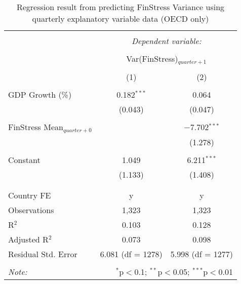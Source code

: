 
\begin{table}[!htbp] \centering 
  \caption{Regression result from predicting FinStress Variance using quarterly explanatory variable data (OECD only)} 
  \label{quarterly_reg} 
\small 
\begin{tabular}{@{\extracolsep{5pt}}lcc} 
\\[-1.8ex]\hline 
\hline \\[-1.8ex] 
 & \multicolumn{2}{c}{\textit{Dependent variable:}} \\ 
\cline{2-3} 
\\[-1.8ex] & \multicolumn{2}{c}{Var(FinStress)$_{quarter+1}$} \\ 
\\[-1.8ex] & (1) & (2)\\ 
\hline \\[-1.8ex] 
 GDP Growth (\%) & 0.182$^{***}$ & 0.064 \\ 
  & (0.043) & (0.047) \\ 
  & & \\ 
 FinStress Mean$_{quarter + 0}$ &  & $-$7.702$^{***}$ \\ 
  &  & (1.278) \\ 
  & & \\ 
 Constant & 1.049 & 6.211$^{***}$ \\ 
  & (1.133) & (1.408) \\ 
  & & \\ 
\hline \\[-1.8ex] 
Country FE & y & y \\ 
Observations & 1,323 & 1,323 \\ 
R$^{2}$ & 0.103 & 0.128 \\ 
Adjusted R$^{2}$ & 0.073 & 0.098 \\ 
Residual Std. Error & 6.081 (df = 1278) & 5.998 (df = 1277) \\ 
\hline 
\hline \\[-1.8ex] 
\textit{Note:}  & \multicolumn{2}{r}{$^{*}$p$<$0.1; $^{**}$p$<$0.05; $^{***}$p$<$0.01} \\ 
\end{tabular} 
\end{table} 
